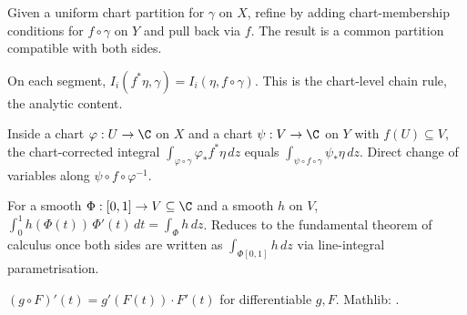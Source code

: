 \begin{lemma}
\label{lem:pcr-r2}
Given a uniform chart partition for $\gamma$ on $X$, refine by adding
chart-membership conditions for $f\circ\gamma$ on $Y$ and pull back
via $f$. The result is a common partition compatible with both sides.
\leanok
\end{lemma}

\begin{lemma}
\label{lem:pcr-r3}
On each segment, $I_{i}(f^{*}\eta,\gamma)=I_{i}(\eta,f\circ\gamma)$.
This is the chart-level chain rule, the analytic content.
\leanok
\end{lemma}

\begin{lemma}
\label{lem:pcr-r4}
Inside a chart $\varphi:U\to\C$ on $X$ and a chart $\psi:V\to\C$ on $Y$
with $f(U)\subseteq V$, the chart-corrected integral
$\int_{\varphi\circ\gamma}\varphi_{*}f^{*}\eta\,dz$ equals
$\int_{\psi\circ f\circ\gamma}\psi_{*}\eta\,dz$.  Direct change of
variables along $\psi\circ f\circ\varphi^{-1}$.
\leanok
\end{lemma}

\begin{lemma}
\label{lem:pcr-r5}
For a smooth $\Phi:[0,1]\to V\subseteq\C$ and a smooth $h$ on $V$,
$\int_{0}^{1}h(\Phi(t))\,\Phi'(t)\,dt = \int_{\Phi}h\,dz$. Reduces
to the fundamental theorem of calculus once both sides are written as
$\int_{\Phi[0,1]}h\,dz$ via line-integral parametrisation.
\leanok
\end{lemma}

\begin{lemma}
\label{lem:pcr-r6}
$(g\circ F)'(t)=g'(F(t))\cdot F'(t)$ for differentiable $g, F$. Mathlib:
.
\leanok\mathlibok
\end{lemma}

